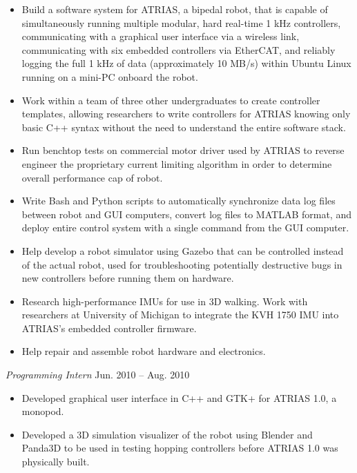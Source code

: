 \documentclass[10pt,letterpaper,margin]{res}
\begin{document}
\begin{resume}
\begin{itemize}
	\item Build a software system for ATRIAS, a bipedal robot, that is capable
		of simultaneously running multiple modular, hard real-time 1 kHz
		controllers, communicating with a graphical user interface via
		a wireless link, communicating with six embedded controllers via
		EtherCAT, and reliably logging the full 1 kHz of data (approximately 10
		MB/s) within Ubuntu Linux running on a mini-PC onboard the robot.
	\item Work within a team of three other undergraduates to create controller
		templates, allowing researchers to write controllers for ATRIAS knowing
		only basic C++ syntax without the need to understand the entire
		software stack.
	\item Run benchtop tests on commercial motor driver used by ATRIAS to
		reverse engineer the proprietary current limiting algorithm in order to
		determine overall performance cap of robot.
	\item Write Bash and Python scripts to automatically synchronize data log
		files between robot and GUI computers, convert log files to MATLAB
		format, and deploy entire control system with a single command from the
		GUI computer.
	\item Help develop a robot simulator using Gazebo that can be controlled
		instead of the actual robot, used for troubleshooting potentially
		destructive bugs in new controllers before running them on hardware.
	\item Research high-performance IMUs for use in 3D walking. Work with
		researchers at University of Michigan to integrate the KVH 1750 IMU
		into ATRIAS's embedded controller firmware.
	\item Help repair and assemble robot hardware and electronics.
\end{itemize}

{\it Programming Intern} \hfill {\color{lightgray} Jun. 2010 -- Aug. 2010}\vspace{0.2em}

\begin{itemize}
	\item Developed graphical user interface in C++ and GTK+ for ATRIAS 1.0,
		a monopod.
	\item Developed a 3D simulation visualizer of the robot using Blender and
		Panda3D to be used in testing hopping controllers before ATRIAS 1.0 was
		physically built.
\end{itemize}




\end{resume}
\end{document}
